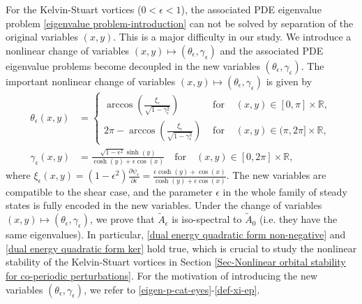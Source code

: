 \documentclass[1 [leqno, 11pt]{amsart}
\numberwithin{equation}{section}
\let\ep=\epsilon
\begin{document}
\begin{CJK*}{GBK}{song}
For the Kelvin-Stuart vortices ($0<\ep<1$), the associated PDE eigenvalue problem \eqref{eigenvalue problem-introduction} can not be solved by separation of the original variables $(x,y)$. This is a major difficulty in our study.
  We introduce a nonlinear  change of variables  $(x,y)\mapsto(\theta_\ep,\gamma_\ep)$
and the associated PDE eigenvalue problems become decoupled in the new variables $(\theta_\ep,\gamma_\ep)$.
The important nonlinear change of  variables $(x,y)\mapsto(\theta_\ep,\gamma_\ep)$ is given by
  \begin{align}\label{transformation-isospectrum-inroduction1}
 \theta_\ep(x,y) & = \left\{ \begin{array}{llll} \arccos \left( \frac{\xi_\ep}{\sqrt{1-\gamma_\ep^2}} \right) & \mbox{ for } & (x,y) \in [0, \pi]\times\mathbb{R}, \\
 2\pi - \arccos \left( \frac{\xi_\ep}{\sqrt{1-\gamma_\ep^2}} \right) & \mbox{ for } & (x,y) \in (\pi, 2\pi]\times\mathbb{R}, \end{array}\right.\\\label{transformation-isospectrum-inroduction2}
 \gamma_\ep(x,y) & = \frac{\sqrt{1 - \epsilon^2}\sinh(y)}{\cosh(y)+\epsilon \cos(x)}\quad\text{for}\quad  (x,y) \in [0, 2\pi]\times\mathbb{R},
 \end{align}
where
$\xi_\ep(x, y)   = (1 - \epsilon^2) \frac{ \partial \psi_\ep}{\partial \ep} = \frac{\epsilon \cosh(y) + \cos(x)}{\cosh(y)+\epsilon \cos(x)}$.
 The new variables are compatible to the shear case, and the  parameter $\ep$ in the whole family of  steady states is fully encoded in the new variables.
Under the change of variables $(x,y)\mapsto(\theta_\ep,\gamma_\ep)$, we prove that $\tilde A_\ep$ is iso-spectral to $\tilde A_0$ (i.e. they have the same eigenvalues).
In particular, 
 \eqref{dual energy quadratic form non-negative} and \eqref{dual energy quadratic form ker} hold true, which is crucial to  study the nonlinear stability of the Kelvin-Stuart vortices in Section \ref{Sec-Nonlinear orbital stability for co-periodic perturbations}.
  For the motivation of introducing the new variables $(\theta_\ep,\gamma_\ep)$, we refer  to \eqref{eigen-p-cat-eyes}-\eqref{def-xi-ep}.




\end{CJK*}
\end{document}

